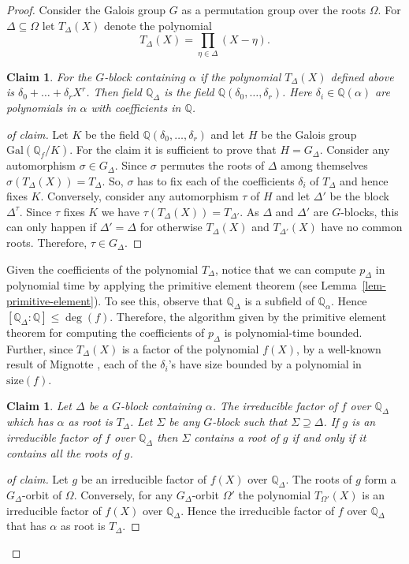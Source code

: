 \documentclass[prodmod,acmtalg]{acmsmall}
\newtheorem{claim}[theorem]{Claim}
\newcommand{\size}[1]{{\ensuremath{\mathrm{size}\left(#1\right)}}}
\newcommand{\Gal}[1]{{\ensuremath{\mathrm{Gal}\left(#1\right)}}}
\newcommand{\Q}{\ensuremath{\mathbb{Q}}}
\begin{document}
\begin{proof}
  Consider the Galois group $G$ as a permutation group over the roots
  $\Omega$. For $\Delta\subseteq\Omega$ let $T_\Delta(X)$ denote the
  polynomial
  \[
  T_\Delta(X) = \prod_{\eta \in \Delta} (X - \eta).
  \]

\begin{claim}\label{claim-prim-poly}
  For the $G$-block containing $\alpha$ if the polynomial
  $T_\Delta(X)$ defined above is $\delta_0 + \ldots + \delta_r X^r$.
  Then field $\Q_\Delta$ is the field $\Q(\delta_0,\ldots,\delta_r)$.
  Here $\delta_i\in\Q(\alpha)$ are polynomials in $\alpha$ with
  coefficients in $\Q$.
\end{claim}
\begin{proof}[of claim]
  Let $K$ be the field $\Q(\delta_0,\ldots,\delta_r)$ and let $H$ be
  the Galois group $\Gal{\Q_f/K}$. For the claim it is sufficient to
  prove that $H = G_\Delta$. Consider any automorphism $\sigma \in
  G_\Delta$. Since $\sigma$ permutes the roots of $\Delta$ among
  themselves $\sigma (T_\Delta(X)) = T_\Delta$. So, $\sigma$ has to
  fix each of the coefficients $\delta_i$ of $T_\Delta$ and hence
  fixes $K$. Conversely, consider any automorphism $\tau$ of $H$ and
  let $\Delta'$ be the block $\Delta^\tau$.  Since $\tau$ fixes $K$ we
  have $\tau (T_\Delta(X)) = T_{\Delta'}$. As $\Delta$ and $\Delta'$
  are $G$-blocks, this can only happen if $\Delta' = \Delta$ for
  otherwise $T_\Delta(X)$ and $T_{\Delta'}(X)$ have no common
  roots. Therefore, $\tau \in G_\Delta$.
\end{proof}

Given the coefficients of the polynomial $T_\Delta$, notice that we
can compute $p_\Delta$ in polynomial time by applying the primitive
element theorem (see Lemma~\ref{lem-primitive-element}). To see this,
observe that $\Q_\Delta$ is a subfield of $\Q_\alpha$. Hence
$[\Q_\Delta:\Q]\leq \deg(f)$. Therefore, the algorithm given by the
primitive element theorem for computing the coefficients of $p_\Delta$
is polynomial-time bounded. Further, since $T_\Delta(X)$ is a factor
of the polynomial $f(X)$, by a well-known result of Mignotte
\cite{Mi74}, each of the $\delta_i$'s have size bounded by a
polynomial in $\size{f}$.

\begin{claim}\label{claim-factor-blocks}
  Let $\Delta$ be a $G$-block containing $\alpha$. The irreducible
  factor of $f$ over $\Q_\Delta$ which has $\alpha$ as root is
  $T_\Delta$. Let $\Sigma$ be any $G$-block such that $\Sigma
  \supseteq \Delta$. If $g$ is an irreducible factor of $f$ over
  $\Q_\Delta$ then $\Sigma$ contains a root of $g$ if and only if it
  contains all the roots of $g$.
\end{claim}
\begin{proof}[of claim]
  Let $g$ be an irreducible factor of $f(X)$ over $\Q_\Delta$.  The
  roots of $g$ form a $G_\Delta$-orbit of $\Omega$. Conversely, for
  any $G_\Delta$-orbit $\Omega'$ the polynomial $T_{\Omega'}(X)$ is an
  irreducible factor of $f(X)$ over $\Q_\Delta$. Hence the irreducible
  factor of $f$ over $\Q_\Delta$ that has $\alpha$ as root is
  $T_\Delta$.


\end{proof}
\end{proof}
\end{document}
